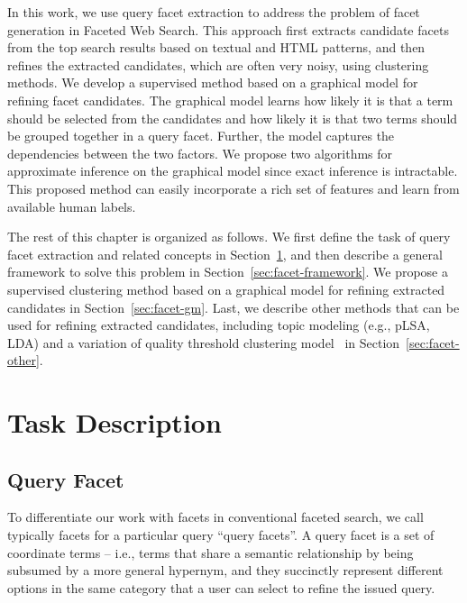 In this work, we use query facet extraction to address the problem of facet generation in Faceted Web Search. This approach first extracts candidate facets from the top search results based on textual and HTML patterns, and then refines the extracted candidates, which are often very noisy, using clustering methods. We develop a supervised method based on a graphical model for refining facet candidates. The graphical model learns how likely it is that a term should be selected from the candidates and how likely it is that two terms should be grouped together in a query facet. Further, the model captures the dependencies between the two factors. We propose two algorithms for approximate inference on the graphical model since  exact inference is intractable. This proposed method can easily incorporate a rich set of features and learn from available human labels.

The rest of this chapter is organized as follows. We first define the task of query facet extraction and related concepts in Section~\ref{sec:facet-task}, and then describe a general framework to solve this problem in Section~\ref{sec:facet-framework}. We propose a supervised clustering method based on a graphical model for refining extracted candidates in Section~\ref{sec:facet-gm}. Last, we describe other methods that can be used for refining extracted candidates, including topic modeling (e.g., pLSA, LDA) and a variation of quality threshold clustering model~\cite{dou2011finding} in Section~\ref{sec:facet-other}. 

\section{Task Description}
\label{sec:facet-task}
\subsection{Query Facet}
To differentiate our work with facets in conventional faceted search, we call typically facets for a particular query ``query facets''. A query facet is a set of coordinate terms -- i.e., terms that share a semantic relationship by being subsumed by a more general hypernym, and they succinctly represent different options in the same category that a user can select to refine the issued query. 

